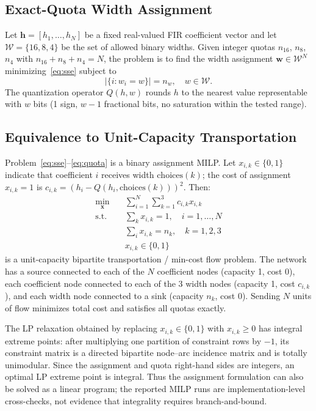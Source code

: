 
\subsection{Exact-Quota Width Assignment}

Let $\mathbf{h} = [h_1, \ldots, h_N]$ be a fixed real-valued FIR
coefficient vector and let $\mathcal{W} = \{16, 8, 4\}$ be the set of
allowed binary widths. Given integer quotas $n_{16}$, $n_8$, $n_4$ with
$n_{16}+n_8+n_4=N$, the problem is to find the width assignment
$\mathbf{w} \in \mathcal{W}^N$ minimizing~\eqref{eq:sse} subject to
\begin{equation}
|\{i : w_i = w\}| = n_w, \quad w \in \mathcal{W}.
\label{eq:quota}
\end{equation}
The quantization operator $Q(h,w)$ rounds $h$ to the nearest value
representable with $w$ bits (1 sign, $w-1$ fractional bits, no saturation
within the tested range).

\subsection{Equivalence to Unit-Capacity Transportation}

Problem~\eqref{eq:sse}--\eqref{eq:quota} is a binary assignment MILP.
Let $x_{i,k} \in \{0,1\}$ indicate that coefficient $i$ receives width
$\text{choices}(k)$; the cost of assignment $x_{i,k}=1$ is
$c_{i,k} = (h_i - Q(h_i, \text{choices}(k)))^2$. Then:
\begin{align}
\min_{\mathbf{x}} \quad & \sum_{i=1}^N \sum_{k=1}^3 c_{i,k} x_{i,k}
\label{eq:milp_obj}\\
\text{s.t.} \quad
& \sum_k x_{i,k} = 1, \quad i=1,\ldots,N \label{eq:milp_assign}\\
& \sum_i x_{i,k} = n_k, \quad k=1,2,3 \label{eq:milp_quota}\\
& x_{i,k} \in \{0,1\} \label{eq:milp_binary}
\end{align}
is a unit-capacity bipartite transportation / min-cost flow problem. The
network has a source connected to each of the $N$ coefficient nodes
(capacity 1, cost 0), each coefficient node connected to each of the 3
width nodes (capacity 1, cost $c_{i,k}$), and each width node connected
to a sink (capacity $n_k$, cost 0). Sending $N$ units of flow minimizes
total cost and satisfies all quotas exactly.

The LP relaxation obtained by replacing $x_{i,k}\in\{0,1\}$ with
$x_{i,k}\geq 0$ has integral extreme points: after multiplying one
partition of constraint rows by $-1$, its constraint matrix is a directed
bipartite node--arc incidence matrix and is totally unimodular. Since the
assignment and quota right-hand sides are integers, an optimal LP extreme
point is integral. Thus the assignment formulation can also be solved as a
linear program; the reported MILP runs are implementation-level
cross-checks, not evidence that integrality requires branch-and-bound.

